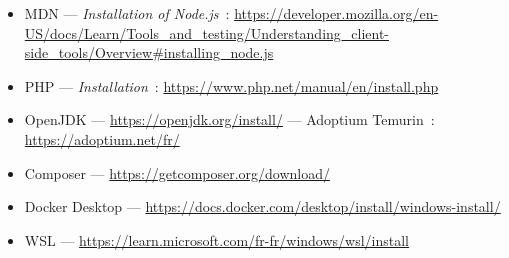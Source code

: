 \begin{ressources}
\begin{itemize}
  \item MDN --- \emph{Installation of Node.js}~: \url{https://developer.mozilla.org/en-US/docs/Learn/Tools_and_testing/Understanding_client-side_tools/Overview#installing_node.js}
  \item PHP --- \emph{Installation}~: \url{https://www.php.net/manual/en/install.php}
  \item OpenJDK --- \url{https://openjdk.org/install/} --- Adoptium Temurin~: \url{https://adoptium.net/fr/}
  \item Composer --- \url{https://getcomposer.org/download/}
  \item Docker Desktop --- \url{https://docs.docker.com/desktop/install/windows-install/}
  \item WSL --- \url{https://learn.microsoft.com/fr-fr/windows/wsl/install}
\end{itemize}
\end{ressources}

